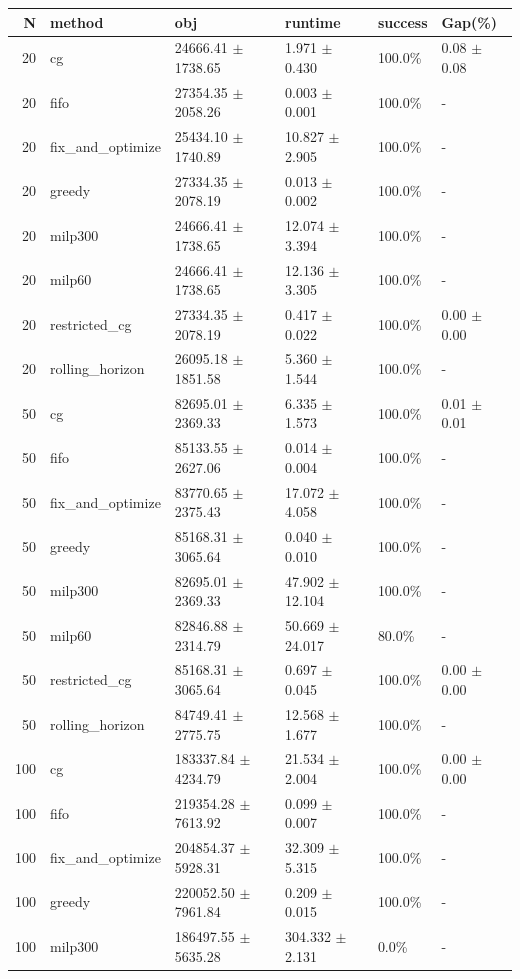 \begin{tabular}{rlllll}
\toprule
N & method & obj & runtime & success & Gap(\%) \\
\midrule
20 & cg & 24666.41 $\pm$ 1738.65 & 1.971 $\pm$ 0.430 & 100.0\% & 0.08 $\pm$ 0.08 \\
20 & fifo & 27354.35 $\pm$ 2058.26 & 0.003 $\pm$ 0.001 & 100.0\% & - \\
20 & fix_and_optimize & 25434.10 $\pm$ 1740.89 & 10.827 $\pm$ 2.905 & 100.0\% & - \\
20 & greedy & 27334.35 $\pm$ 2078.19 & 0.013 $\pm$ 0.002 & 100.0\% & - \\
20 & milp300 & 24666.41 $\pm$ 1738.65 & 12.074 $\pm$ 3.394 & 100.0\% & - \\
20 & milp60 & 24666.41 $\pm$ 1738.65 & 12.136 $\pm$ 3.305 & 100.0\% & - \\
20 & restricted_cg & 27334.35 $\pm$ 2078.19 & 0.417 $\pm$ 0.022 & 100.0\% & 0.00 $\pm$ 0.00 \\
20 & rolling_horizon & 26095.18 $\pm$ 1851.58 & 5.360 $\pm$ 1.544 & 100.0\% & - \\
50 & cg & 82695.01 $\pm$ 2369.33 & 6.335 $\pm$ 1.573 & 100.0\% & 0.01 $\pm$ 0.01 \\
50 & fifo & 85133.55 $\pm$ 2627.06 & 0.014 $\pm$ 0.004 & 100.0\% & - \\
50 & fix_and_optimize & 83770.65 $\pm$ 2375.43 & 17.072 $\pm$ 4.058 & 100.0\% & - \\
50 & greedy & 85168.31 $\pm$ 3065.64 & 0.040 $\pm$ 0.010 & 100.0\% & - \\
50 & milp300 & 82695.01 $\pm$ 2369.33 & 47.902 $\pm$ 12.104 & 100.0\% & - \\
50 & milp60 & 82846.88 $\pm$ 2314.79 & 50.669 $\pm$ 24.017 & 80.0\% & - \\
50 & restricted_cg & 85168.31 $\pm$ 3065.64 & 0.697 $\pm$ 0.045 & 100.0\% & 0.00 $\pm$ 0.00 \\
50 & rolling_horizon & 84749.41 $\pm$ 2775.75 & 12.568 $\pm$ 1.677 & 100.0\% & - \\
100 & cg & 183337.84 $\pm$ 4234.79 & 21.534 $\pm$ 2.004 & 100.0\% & 0.00 $\pm$ 0.00 \\
100 & fifo & 219354.28 $\pm$ 7613.92 & 0.099 $\pm$ 0.007 & 100.0\% & - \\
100 & fix_and_optimize & 204854.37 $\pm$ 5928.31 & 32.309 $\pm$ 5.315 & 100.0\% & - \\
100 & greedy & 220052.50 $\pm$ 7961.84 & 0.209 $\pm$ 0.015 & 100.0\% & - \\
100 & milp300 & 186497.55 $\pm$ 5635.28 & 304.332 $\pm$ 2.131 & 0.0\% & - \\

\end{tabular}
